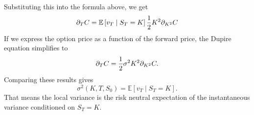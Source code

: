Substituting this into the formula above, we get
$$\partial_{T} C = \mathbb{E}\left[v_T\mid S_T = K\right]\frac{1}{2}K^2\partial_{K^2} C$$
If we express the option price as a function of the forward price, the Dupire equation simplifies to 
$$\partial_{T} C = \frac{1}{2} \sigma^2 K^2\partial_{K^2} C.$$
Comparing these results gives
$$\sigma^2(K,T,S_0) = \mathbb{E}\left[v_T\mid S_T = K\right].$$
That means the local variance is the risk neutral expectation of the instantaneous variance conditioned on $S_T=K$.